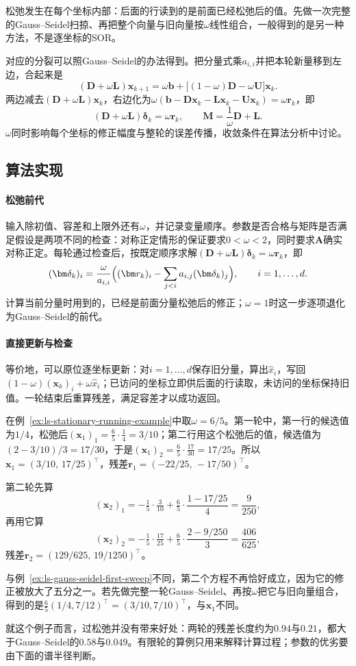 松弛发生在每个坐标内部：后面的行读到的是前面已经松弛后的值。先做一次完整的Gauss--Seidel扫掠、再把整个向量与旧向量按$\omega$线性组合，一般得到的是另一种方法，不是逐坐标的SOR。

对应的分裂可以照Gauss--Seidel的办法得到。把分量式乘$a_{i,i}$并把本轮新量移到左边，合起来是
\[
(\bm D+\omega\bm L)\bm x_{k+1}=\omega\bm b+\bigl[(1-\omega)\bm D-\omega\bm U\bigr]\bm x_k .
\]
两边减去$(\bm D+\omega\bm L)\bm x_k$，右边化为$\omega(\bm b-\bm D\bm x_k-\bm L\bm x_k-\bm U\bm x_k)=\omega\bm r_k$，即
\[
(\bm D+\omega\bm L)\bm\delta_k=\omega\bm r_k ,\qquad
\bm M=\frac1\omega\bm D+\bm L .
\]
$\omega$同时影响每个坐标的修正幅度与整轮的误差传播，收敛条件在算法分析中讨论。

\subsection{算法实现}

\paragraph{松弛前代}
输入除初值、容差和上限外还有$\omega$，并记录变量顺序。参数是否合格与矩阵是否满足假设是两项不同的检查：对称正定情形的保证要求$0<\omega<2$，同时要求$\bm A$确实对称正定。每轮通过检查后，按既定顺序求解$(\bm D+\omega\bm L)\bm\delta_k=\omega\bm r_k$，即
\[
(\bm\delta_k)_i=\frac{\omega}{a_{i,i}}\Bigl((\bm r_k)_i-\sum_{j<i}a_{i,j}(\bm\delta_k)_j\Bigr),\qquad i=1,\ldots,d .
\]
计算当前分量时用到的，已经是前面分量松弛后的修正；$\omega=1$时这一步逐项退化为Gauss--Seidel的前代。

\paragraph{直接更新与检查}
等价地，可以原位逐坐标更新：对$i=1,\ldots,d$保存旧分量，算出$\widehat x_i$，写回$(1-\omega)(\bm x_k)_i+\omega\widehat x_i$；已访问的坐标立即供后面的行读取，未访问的坐标保持旧值。一轮结束后重算残差，满足容差才以成功返回。

\begin{example}[SOR迭代的前两轮]
\label{ex:ls-sor-first-sweep}
在例~\ref{ex:ls-stationary-running-example}中取$\omega=6/5$。第一轮中，第一行的候选值为$1/4$，松弛后$(\bm x_1)_1=\tfrac65\cdot\tfrac14=3/10$；第二行用这个松弛后的值，候选值为$(2-3/10)/3=17/30$，于是$(\bm x_1)_2=\tfrac65\cdot\tfrac{17}{30}=17/25$。所以$\bm x_1=(3/10,\,17/25)^\top$，残差$\bm r_1=(-22/25,\,-17/50)^\top$。

第二轮先算
\[
(\bm x_2)_1=-\tfrac15\cdot\tfrac3{10}+\tfrac65\cdot\frac{1-17/25}{4}=\frac9{250},
\]
再用它算
\[
(\bm x_2)_2=-\tfrac15\cdot\tfrac{17}{25}+\tfrac65\cdot\frac{2-9/250}{3}=\frac{406}{625},
\]
残差$\bm r_2=(129/625,\,19/1250)^\top$。

与例~\ref{ex:ls-gauss-seidel-first-sweep}不同，第二个方程不再恰好成立，因为它的修正被放大了五分之一。若先做完整一轮Gauss--Seidel、再按$\omega$把它与旧向量组合，得到的是$\tfrac65(1/4,7/12)^\top=(3/10,7/10)^\top$，与$\bm x_1$不同。

就这个例子而言，过松弛并没有带来好处：两轮的残差长度约为$0.94$与$0.21$，都大于Gauss--Seidel的$0.58$与$0.049$。有限轮的算例只用来解释计算过程；参数的优劣要由下面的谱半径判断。
\end{example}


